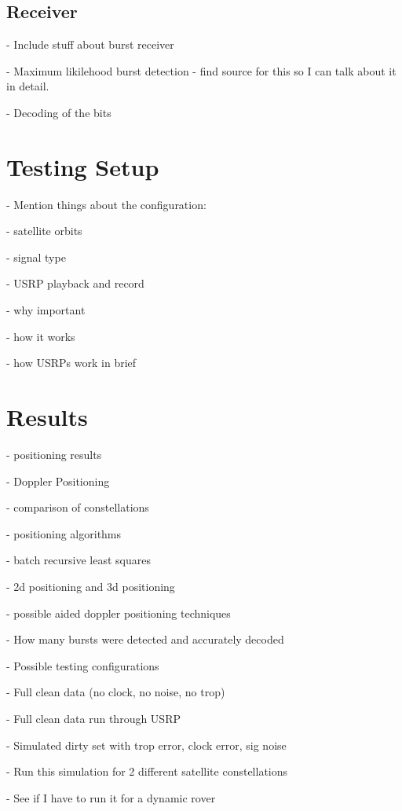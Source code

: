 \documentclass[12pt]{report}
\begin{document}
\section{Receiver}
- Include stuff about burst receiver

- Maximum likilehood burst detection
    - find source for this so I can talk about it in detail.


- Decoding of the bits
 
\chapter{Testing Setup}
    - Mention things about the configuration:

    - satellite orbits

    - signal type

    - USRP playback and record

    - why important

    - how it works

    - how USRPs work in brief

\chapter{Results}

    - positioning results

    - Doppler Positioning 

    - comparison of constellations 

    - positioning algorithms

    - batch recursive least squares

    - 2d positioning and 3d positioning

    - possible aided doppler positioning techniques

    - How many bursts were detected and accurately decoded

    - Possible testing configurations   
        
        - Full clean data (no clock, no noise, no trop)

        - Full clean data run through USRP 

        - Simulated dirty set with trop error, clock error, sig noise

        - Run this simulation for 2 different satellite constellations

        - See if I have to run it for a dynamic rover
\end{document}
